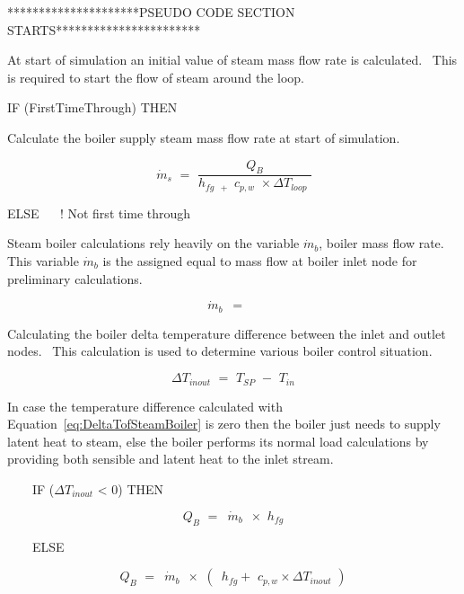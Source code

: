 *********************PSEUDO CODE SECTION STARTS***********************

At start of simulation an initial value of steam mass flow rate is calculated.~ This is required to start the flow of steam around the loop.

IF (FirstTimeThrough) THEN

Calculate the boiler supply steam mass flow rate at start of simulation.

\begin{equation}
\,{\dot m_s}\,\, = \,\,\frac{{{Q_B}}}{{{h_{fg\,\,\, + }}\,\,{c_{p,w}}\,\, \times \Delta {T_{loop}}\,\,}}
\end{equation}

ELSE ~~ ! Not first time through

Steam boiler calculations rely heavily on the variable \(\dot m\)\(_{b}\), boiler mass flow rate.~ This variable \(\dot m_{b}\) is the assigned equal to mass flow at boiler inlet node for preliminary calculations.

\begin{equation}
\,{\dot m_b}\,\,\, = \,\,\,\mathop {\,{{\dot m}_{InletNode}}}\limits^{}
\end{equation}

Calculating the boiler delta temperature difference between the inlet and outlet nodes.~ This calculation is used to determine various boiler control situation.

\begin{equation}
\Delta {T_{inout}}\,\, = \,\,{T_{SP}}\,\, - \,\,{T_{in}}
\label{eq:DeltaTofSteamBoiler}
\end{equation}

In case the temperature difference calculated with Equation~\ref{eq:DeltaTofSteamBoiler} is zero then the boiler just needs to supply latent heat to steam, else the boiler performs its normal load calculations by providing both sensible and latent heat to the inlet stream.

~~~~IF (\(\Delta {T_{inout}}\) < 0) THEN

\begin{equation}
{Q_B}\,\, = \,\,\,{\dot m_b}\,\,\, \times \,\,{h_{fg}}
\end{equation}

~~~~ELSE

\begin{equation}
{Q_B}\,\, = \,\,\,{\dot m_b}\,\,\, \times \,\,(\,\,\,{h_{fg}} + \,\,{c_{p,w}} \times \Delta {T_{inout}}\,\,)
\end{equation}

